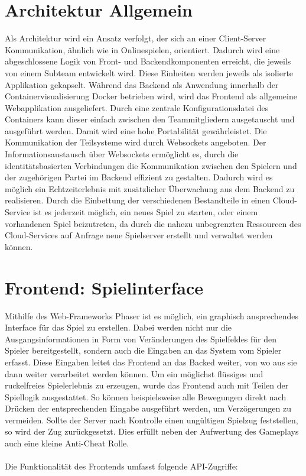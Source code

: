 \documentclass[conference]{IEEEtran}
\begin{document}
\section{Architektur Allgemein}
Als Architektur wird ein Ansatz verfolgt, der sich an einer Client-Server Kommunikation, ähnlich wie in Onlinespielen, orientiert.
Dadurch wird eine abgeschlossene Logik von Front- und Backendkomponenten erreicht, die jeweils
von einem Subteam entwickelt wird. Diese Einheiten werden jeweils als isolierte Applikation gekapselt. Während das Backend als Anwendung innerhalb der Containervisualisierung Docker betrieben wird, wird das Frontend als allgemeine Webapplikation ausgeliefert. Durch eine zentrale Konfigurationsdatei des Containers kann dieser einfach zwischen den Teammitgliedern ausgetauscht und ausgeführt werden. Damit wird eine hohe Portabilität gewährleistet.
Die Kommunikation der Teilsysteme wird durch Websockets angeboten. Der Informationsaustausch über Websockets ermöglicht es, durch die identitätsbasierten Verbindungen die Kommunikation zwischen den Spielern und der zugehörigen Partei im Backend effizient zu gestalten.
Dadurch wird es möglich ein Echtzeiterlebnis mit zusätzlicher Überwachung aus dem Backend zu realisieren.
Durch die Einbettung der verschiedenen Bestandteile in einen Cloud-Service ist es jederzeit möglich, ein neues Spiel zu starten, oder einem vorhandenen Spiel beizutreten, da durch die nahezu unbegrenzten Ressourcen des Cloud-Services auf Anfrage neue Spielserver erstellt und verwaltet werden können.

\section{Frontend: Spielinterface}
Mithilfe des Web-Frameworks Phaser ist es möglich, ein graphisch ansprechendes Interface für das Spiel zu erstellen. Dabei werden nicht nur die Ausgangsinformationen in Form von Veränderungen des Spielfeldes für den Spieler bereitgestellt, sondern auch die Eingaben an das System vom Spieler erfasst. Diese Eingaben leitet das Frontend an das Backed weiter, von wo aus sie dann weiter verarbeitet werden können. Um ein möglichst flüssiges und ruckelfreies Spielerlebnis zu erzeugen, wurde das Frontend auch mit Teilen der Spiellogik ausgestattet. So können beispielsweise alle Bewegungen direkt nach Drücken der entsprechenden Eingabe ausgeführt werden, um Verzögerungen zu vermeiden. Sollte der Server nach Kontrolle einen ungültigen Spielzug feststellen, so wird der Zug zurückgesetzt. Dies erfüllt neben der Aufwertung des Gameplays auch eine kleine Anti-Cheat Rolle.
\\
\\
Die Funktionalität des Frontends umfasst folgende API-Zugriffe:
\smallskip
\end{document}
